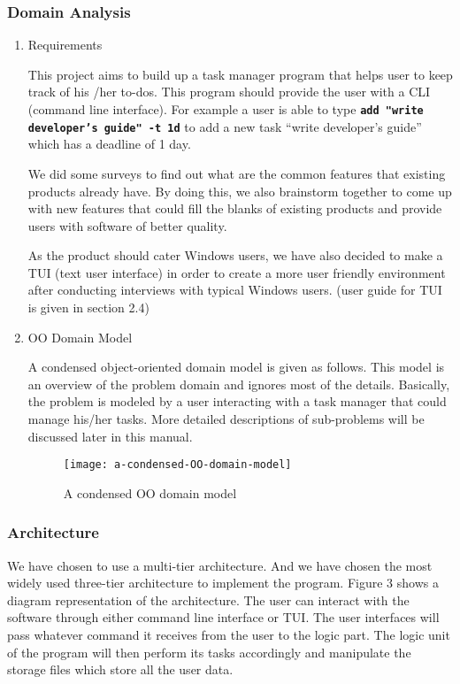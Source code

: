 \documentclass[12pt, a4paper]{article}
\newcommand{\cmdinline}[1]{{\bf \texttt{#1}}}
\begin{document}
\subsubsection{Domain Analysis}
\begin{enumerate} 
\item Requirements

This project aims to build up a task manager program that helps user to keep track of his /her
to-dos. This program should provide the user with a CLI (command line interface). For example a
user is able to type \cmdinline{add "write developer's guide" -t 1d} to add a new task ``write
developer's guide'' which has a deadline of 1 day.

We did some surveys to find out what are the common features that existing products
already have. By doing this, we also brainstorm together to come up with new features that could
fill the blanks of existing products and provide users with software of better quality.

As the product should cater Windows users, we have also decided to make a TUI (text user interface) in order to create a
more user friendly environment after conducting interviews with typical Windows users. (user guide for TUI is given in section 2.4)

\item OO Domain Model

A condensed object-oriented domain model is given as follows. This model is an overview of the
problem domain and ignores most of the details. Basically, the problem is modeled by a user
interacting with a task manager that could manage his/her tasks. More detailed descriptions of
sub-problems will be discussed later in this manual.

\begin{figure}[h]
  \centering
  \texttt{[image: a-condensed-OO-domain-model]}
  \caption{A condensed OO domain model}
\end{figure}
\end{enumerate}

\subsubsection{Architecture}
We have chosen to use a multi-tier architecture. And we have chosen the most widely used
three-tier architecture to implement the program. Figure 3 shows a diagram representation of
the architecture. The user can interact with the software through either command line interface
or TUI. The user interfaces will pass whatever command it receives from the user to the logic part.
The logic unit of the program will then perform its tasks accordingly and manipulate the storage
files which store all the user data.
\end{document}

